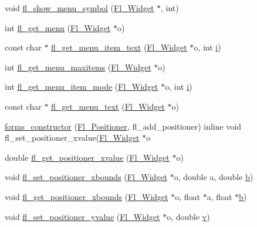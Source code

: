 \begin{DoxyCompactItemize}
\item 
void \hyperlink{forms_8_h_a84ae74611bf1b6a0fde7a1d1b27e5406}{fl\+\_\+show\+\_\+menu\+\_\+symbol} (\hyperlink{class_fl___widget}{Fl\+\_\+\+Widget} $\ast$, int)
\item 
int \hyperlink{forms_8_h_a0d85e953532738ef00e16005497892f8}{fl\+\_\+get\+\_\+menu} (\hyperlink{class_fl___widget}{Fl\+\_\+\+Widget} $\ast$o)
\item 
const char $\ast$ \hyperlink{forms_8_h_a654cfeedab3e924b9283f38125e7e254}{fl\+\_\+get\+\_\+menu\+\_\+item\+\_\+text} (\hyperlink{class_fl___widget}{Fl\+\_\+\+Widget} $\ast$o, int \hyperlink{forms_8_h_acb559820d9ca11295b4500f179ef6392}{i})
\item 
int \hyperlink{forms_8_h_ad79af5293e800356ac207f2a39d93128}{fl\+\_\+get\+\_\+menu\+\_\+maxitems} (\hyperlink{class_fl___widget}{Fl\+\_\+\+Widget} $\ast$o)
\item 
int \hyperlink{forms_8_h_a85f323f62b2eb4d330725285758a9a23}{fl\+\_\+get\+\_\+menu\+\_\+item\+\_\+mode} (\hyperlink{class_fl___widget}{Fl\+\_\+\+Widget} $\ast$o, int \hyperlink{forms_8_h_acb559820d9ca11295b4500f179ef6392}{i})
\item 
const char $\ast$ \hyperlink{forms_8_h_a361da809bf1196db33dace7667d2046e}{fl\+\_\+get\+\_\+menu\+\_\+text} (\hyperlink{class_fl___widget}{Fl\+\_\+\+Widget} $\ast$o)
\item 
\hyperlink{forms_8_h_aee21f47b4714e0edb0625f8df5fe05ca}{forms\+\_\+constructor} (\hyperlink{class_fl___positioner}{Fl\+\_\+\+Positioner}, fl\+\_\+add\+\_\+positioner) inline void fl\+\_\+set\+\_\+positioner\+\_\+xvalue(\hyperlink{class_fl___widget}{Fl\+\_\+\+Widget} $\ast$o
\item 
double \hyperlink{forms_8_h_afc3a9573fd5ff877fbbabe61aebb9a02}{fl\+\_\+get\+\_\+positioner\+\_\+xvalue} (\hyperlink{class_fl___widget}{Fl\+\_\+\+Widget} $\ast$o)
\item 
void \hyperlink{forms_8_h_ab5a39a177389f45e62d2a4164ccca6f2}{fl\+\_\+set\+\_\+positioner\+\_\+xbounds} (\hyperlink{class_fl___widget}{Fl\+\_\+\+Widget} $\ast$o, double a, double \hyperlink{forms_8_h_a0ba06a290a384fa06b1b90745827dae2}{b})
\item 
void \hyperlink{forms_8_h_a88f110a39ed4e60bf4cb8a47987da4fa}{fl\+\_\+get\+\_\+positioner\+\_\+xbounds} (\hyperlink{class_fl___widget}{Fl\+\_\+\+Widget} $\ast$o, float $\ast$a, float $\ast$\hyperlink{forms_8_h_a0ba06a290a384fa06b1b90745827dae2}{b})
\item 
void \hyperlink{forms_8_h_a9eb1cd86bd26dee46f1543a289a29def}{fl\+\_\+set\+\_\+positioner\+\_\+yvalue} (\hyperlink{class_fl___widget}{Fl\+\_\+\+Widget} $\ast$o, double \hyperlink{forms_8_h_a3b90d5a73541ab9402511d87bed076ef}{v})

\end{DoxyCompactItemize}
